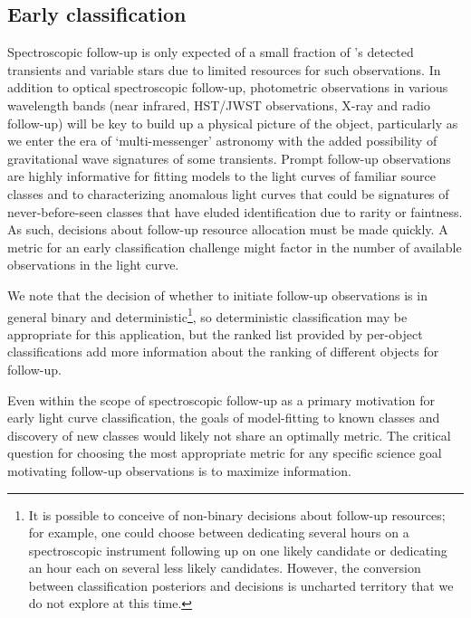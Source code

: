 \subsection{Early classification}
\label{sec:early}


Spectroscopic follow-up is only expected of a small fraction of \lsst's detected transients and variable stars due to limited resources for such observations. In addition to optical spectroscopic follow-up, photometric observations in various wavelength bands (near infrared, HST/JWST observations, X-ray and radio follow-up) will be key to build up a physical picture of the object, particularly as we enter the era of `multi-messenger' astronomy with the added possibility of gravitational wave signatures of some transients.
Prompt follow-up observations are highly informative for fitting models to the light curves of familiar source classes and to characterizing anomalous light curves that could be signatures of never-before-seen classes that have eluded identification due to rarity or faintness. As such, decisions about follow-up resource allocation must be made quickly. A metric for an early classification challenge might factor in the number of available observations in the light curve.


We note that the decision of whether to initiate follow-up observations is in general binary and deterministic\footnote{It is possible to conceive of non-binary decisions about follow-up resources; for example, one could choose between dedicating several hours on a spectroscopic instrument following up on one likely candidate or dedicating an hour each on several less likely candidates.  However, the conversion between classification posteriors and decisions is uncharted territory that we do not explore at this time.}, so deterministic classification may be appropriate for this application, but the ranked list provided by per-object classifications add more information about the ranking of different objects for follow-up.

Even within the scope of spectroscopic follow-up as a primary motivation for early light curve classification, the goals of model-fitting to known classes and discovery of new classes would likely not share an optimally metric. The critical question for choosing the most appropriate metric for any specific science goal motivating follow-up observations is to maximize information.

